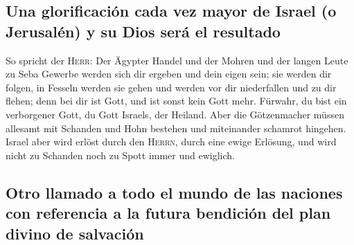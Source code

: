 \hypertarget{una-glorificaciuxf3n-cada-vez-mayor-de-israel-o-jerusaluxe9n-y-su-dios-seruxe1-el-resultado}{%
\subsection{Una glorificación cada vez mayor de Israel (o Jerusalén) y
su Dios será el
resultado}\label{una-glorificaciuxf3n-cada-vez-mayor-de-israel-o-jerusaluxe9n-y-su-dios-seruxe1-el-resultado}}

 So spricht der \textsc{Herr}: Der Ägypter Handel und der
Mohren und der langen Leute zu Seba Gewerbe werden sich dir ergeben und
dein eigen sein; sie werden dir folgen, in Fesseln werden sie gehen und
werden vor dir niederfallen und zu dir flehen; denn bei dir ist Gott,
und ist sonst kein Gott mehr.  Fürwahr, du bist ein
verborgener Gott, du Gott Israels, der Heiland.  Aber die
Götzenmacher müssen allesamt mit Schanden und Hohn bestehen und
miteinander schamrot hingehen.  Israel aber wird erlöst
durch den \textsc{Herrn}, durch eine ewige Erlösung, und wird nicht zu
Schanden noch zu Spott immer und ewiglich.

\hypertarget{otro-llamado-a-todo-el-mundo-de-las-naciones-con-referencia-a-la-futura-bendiciuxf3n-del-plan-divino-de-salvaciuxf3n}{%
\subsection{Otro llamado a todo el mundo de las naciones con referencia
a la futura bendición del plan divino de
salvación}\label{otro-llamado-a-todo-el-mundo-de-las-naciones-con-referencia-a-la-futura-bendiciuxf3n-del-plan-divino-de-salvaciuxf3n}}

